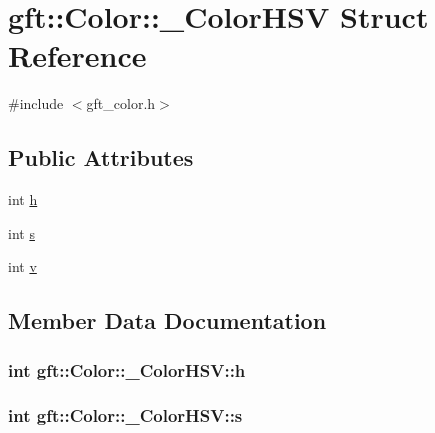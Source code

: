 \hypertarget{structgft_1_1Color_1_1__ColorHSV}{}\section{gft\+:\+:Color\+:\+:\+\_\+\+Color\+H\+SV Struct Reference}
\label{structgft_1_1Color_1_1__ColorHSV}


{\ttfamily \#include $<$gft\+\_\+color.\+h$>$}

\subsection*{Public Attributes}
\begin{DoxyCompactItemize}
\item 
int \hyperlink{structgft_1_1Color_1_1__ColorHSV_ab7543db4381c62e2e7d627522c331e66}{h}
\item 
int \hyperlink{structgft_1_1Color_1_1__ColorHSV_a4f735f49ad8062bad5797d04bdd76c45}{s}
\item 
int \hyperlink{structgft_1_1Color_1_1__ColorHSV_a4030c27b07fa59ce2f6a9c88c83721c6}{v}
\end{DoxyCompactItemize}


\subsection{Member Data Documentation}
\subsubsection[{\texorpdfstring{h}{h}}]{\setlength{\rightskip}{0pt plus 5cm}int gft\+::\+Color\+::\+\_\+\+Color\+H\+S\+V\+::h}\hypertarget{structgft_1_1Color_1_1__ColorHSV_ab7543db4381c62e2e7d627522c331e66}{}\label{structgft_1_1Color_1_1__ColorHSV_ab7543db4381c62e2e7d627522c331e66}
\subsubsection[{\texorpdfstring{s}{s}}]{\setlength{\rightskip}{0pt plus 5cm}int gft\+::\+Color\+::\+\_\+\+Color\+H\+S\+V\+::s}\hypertarget{structgft_1_1Color_1_1__ColorHSV_a4f735f49ad8062bad5797d04bdd76c45}{}\label{structgft_1_1Color_1_1__ColorHSV_a4f735f49ad8062bad5797d04bdd76c45}
